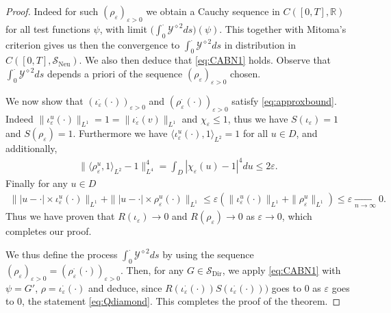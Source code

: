 \documentclass[a4paper, reqno, 12pt]{amsart}
\theoremstyle{plain}
\theoremstyle{definition}
\newcommand{\R}{\mathbb{R}}
\newcommand{\Sdir}{\mathcal{S}_{\text{Dir}}}
\begin{document}
\begin{proof}
Indeed for such $(\rho_{\varepsilon})_{\varepsilon>0}$ we obtain a Cauchy sequence in $C([0,T],\R)$ for all test functions $\psi$, with limit $\big( \int_0^\cdot \mathcal Y^{\diamond 2}ds\big)(\psi)$. This together with Mitoma's criterion gives us then the convergence to $\int_0^\cdot \mathcal Y^{\diamond 2}ds $ in distribution in $C([0,T],\mathcal S_{\text{Neu}})$. We also then deduce that \eqref{eq:CABN1} holds. Observe that $\int_0^\cdot \mathcal Y^{\diamond 2}ds$ depends a priori of the sequence $(\rho_{\varepsilon})_{\varepsilon>0}$ chosen. 


    
We now show that $(\iota^{\cdot}_{\varepsilon}(\cdot))_{\varepsilon>0}$ and $(\rho^{\cdot}_{\varepsilon}(\cdot))_{\varepsilon>0}$ satisfy \eqref{eq:approxbound}. Indeed $\|\iota_{\varepsilon}^u (\cdot)\|_{L^1} = 1 = \|\iota_{\varepsilon}^{\cdot}(v)\|_{L^1}$ and $\chi_{\varepsilon}\leq 1$, thus we have $S(\iota_{\varepsilon}) = 1$ and $ S(\rho_{\varepsilon}) = 1$. Furthermore we have $\langle \iota_{\varepsilon}^u(\cdot), 1\rangle_{L^2} = 1$ for all $u\in D$, and additionally,  
    \begin{align*}
        \|\langle \rho_{\varepsilon}^u,1\rangle_{L^2} -1\|_{L^4}^4 = \int_D |\chi_{\varepsilon}(u)-1|^4 du \leq 2 \varepsilon.
    \end{align*} 
Finally for any $u\in D$
    \begin{align*}
        \||u-\cdot|\times \iota_{\varepsilon}^u(\cdot)\|_{L^1} + \||u-\cdot|\times \rho_{\varepsilon}^u(\cdot)\|_{L^1}  \leq  \varepsilon( \|\iota_{\varepsilon}^u(\cdot)\|_{L^1} + \|\rho_{\varepsilon}^u\|_{L^1}) \leq \varepsilon\xrightarrow[n\to\infty]{} 0 .
    \end{align*}
    Thus we have proven that $R(\iota_{\varepsilon})\to 0$ and $R(\rho_{\varepsilon})\to 0$ as $\varepsilon\to 0$, which completes our proof. 
    
 \bigskip 
 
 We thus define the process $\int_0^\cdot \mathcal Y^{\diamond 2}ds$ by using the sequence $(\rho_\varepsilon)_{\varepsilon>0}  = (\rho_\varepsilon^\cdot (\cdot))_{\varepsilon>0}$. Then, for any $G \in \Sdir$, we apply \eqref{eq:CABN1} with $\psi=G'$, $\rho = \iota_\varepsilon^\cdot (\cdot)$ and deduce, since  $R(\iota_{\varepsilon}^\cdot (\cdot))S(\iota_{\varepsilon}^\cdot(\cdot)))$ goes to $0$ as $\varepsilon$ goes to $0$, the statement \eqref{eq:Qdiamond}. This completes the proof of the theorem. 
\end{proof}
\end{document}
